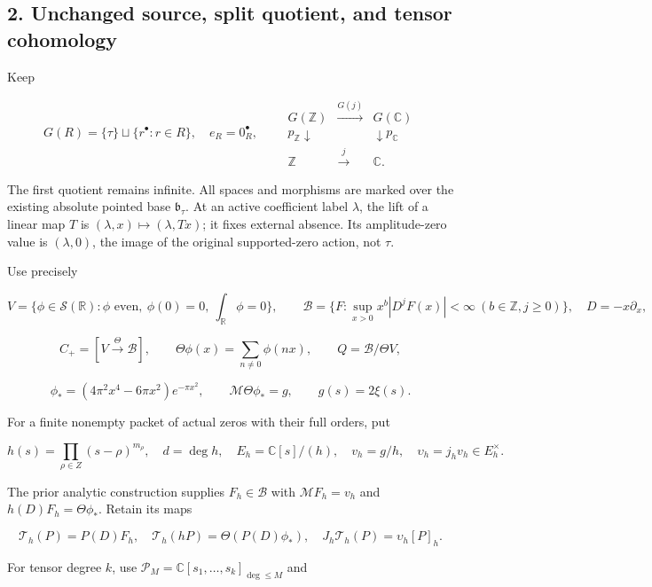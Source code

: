 \documentclass[
]{article}
\begin{document}
\subsection{2. Unchanged source, split quotient, and tensor
cohomology}\label{unchanged-source-split-quotient-and-tensor-cohomology}

Keep

\[G(R)=\{\tau\}\sqcup\{r^\bullet:r\in R\},\quad e_R=0_R^\bullet,\qquad
\begin{array}{ccc}G(\mathbb Z)&\xrightarrow{G(j)}&G(\mathbb C)\\
p_{\mathbb Z}\downarrow&&\downarrow p_{\mathbb C}\\
\mathbb Z&\xrightarrow{j}&\mathbb C.\end{array}\tag{2.1}\]

The first quotient remains infinite. All spaces and morphisms are marked
over the existing absolute pointed base \(\mathfrak b_\tau\). At an
active coefficient label \(\lambda\), the lift of a linear map \(T\) is
\((\lambda,x)\mapsto(\lambda,Tx)\); it fixes external absence. Its
amplitude-zero value is \((\lambda,0)\), the image of the original
supported-zero action, not \(\tau\).

Use precisely

\[V=\{\phi\in\mathcal S(\mathbb R):\phi\text{ even},\ \phi(0)=0,\ \int_{\mathbb R}\phi=0\},\qquad
\mathscr B=\{F:\sup_{x>0}x^b|D^jF(x)|<\infty\ (b\in\mathbb Z,j\ge0)\},\quad D=-x\partial_x,\]

\[C_+=[V\xrightarrow\Theta\mathscr B],\qquad
\Theta\phi(x)=\sum_{n\ne0}\phi(nx),\qquad Q=\mathscr B/\Theta V,\]

\[\phi_*=(4\pi^2x^4-6\pi x^2)e^{-\pi x^2},\qquad
\mathcal M\Theta\phi_*=g,\qquad g(s)=2\xi(s).\tag{2.2}\]

For a finite nonempty packet of actual zeros with their full orders, put

\[h(s)=\prod_{\rho\in Z}(s-\rho)^{m_\rho},\quad d=\deg h,\quad
E_h=\mathbb C[s]/(h),\quad v_h=g/h,\quad \upsilon_h=j_hv_h\in E_h^\times.\]

The prior analytic construction supplies \(F_h\in\mathscr B\) with
\(\mathcal MF_h=v_h\) and \(h(D)F_h=\Theta\phi_*\). Retain its maps

\[\mathcal T_h(P)=P(D)F_h,\quad
\mathcal T_h(hP)=\Theta(P(D)\phi_*),\quad J_h\mathcal T_h(P)=\upsilon_h[P]_h.\tag{2.3}\]

For tensor degree \(k\), use
\(\mathcal P_M=\mathbb C[s_1,\ldots,s_k]_{\deg\le M}\) and
\end{document}
